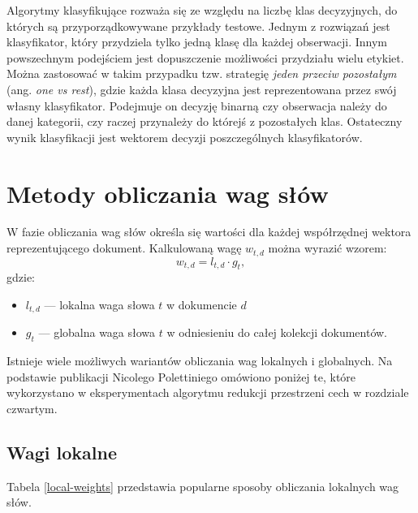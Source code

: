 \documentclass{pracamgr}
\begin{document}
Algorytmy klasyfikujące rozważa się ze względu na liczbę klas decyzyjnych, do których są przyporządkowywane przykłady testowe. Jednym z rozwiązań jest klasyfikator, który przydziela tylko jedną klasę dla każdej obserwacji. Innym powszechnym podejściem jest dopuszczenie możliwości przydziału wielu etykiet. Można zastosować w takim przypadku tzw. strategię \textit{jeden przeciw pozostałym} (ang. \textit{one vs rest}), gdzie każda klasa decyzyjna jest reprezentowana przez swój własny klasyfikator. Podejmuje on decyzję binarną czy obserwacja należy do danej kategorii, czy raczej przynależy do którejś z pozostałych klas. Ostateczny wynik klasyfikacji jest wektorem decyzji poszczególnych klasyfikatorów.

\section{Metody obliczania wag słów}

W fazie obliczania wag słów określa się wartości dla każdej współrzędnej wektora reprezentującego dokument. Kalkulowaną wagę $w_{t,d}$ można wyrazić wzorem:
\[
w_{t,d} = l_{t,d} \cdot g_{t},
\]
gdzie:
\begin{itemize}
    \item $l_{t,d}$ --- lokalna waga słowa $t$ w dokumencie $d$
    \item $g_{t}$ --- globalna waga słowa $t$ w odniesieniu do całej kolekcji dokumentów.
\end{itemize}

Istnieje wiele możliwych wariantów obliczania wag lokalnych i globalnych. Na podstawie publikacji Nicolego Polettiniego \cite{polettini} omówiono poniżej te, które wykorzystano w eksperymentach algorytmu redukcji przestrzeni cech w rozdziale czwartym.

\subsection{Wagi lokalne}

Tabela \ref{local-weights} przedstawia popularne sposoby obliczania lokalnych wag słów.
\end{document}
